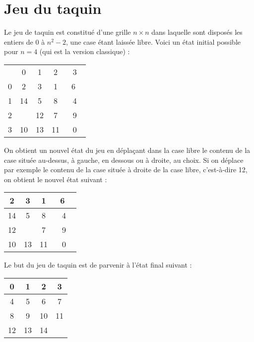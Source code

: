 \section*{Jeu du taquin}

Le jeu de taquin est constitué d'une grille $n \times n$ dans laquelle
sont disposés les entiers de $0$ à $n^{2} - 2$, une case étant laissée libre.
Voici un état initial possible pour $n = 4$ (qui est la version classique) :

\renewcommand{\arraystretch}{1.5}

\begin{center}
  \begin{tabular}{r|c|c|c|c|}
    \multicolumn{1}{c}{}
    & \multicolumn{1}{c}{0}
    & \multicolumn{1}{c}{1}
    & \multicolumn{1}{c}{2}
    & \multicolumn{1}{c}{3} \\ \cline{2-5}
    0 & 2 & 3 & 1 & \ 6 \ \\ \cline{2-5}
    1 & 14 & 5 & 8 & 4 \\ \cline{2-5}
    2 & & 12 & 7 & 9 \\ \cline{2-5}
    3 & 10&13 & 11 & 0 \\ \cline{2-5}
  \end{tabular}
\end{center}

On obtient un nouvel état du jeu en déplaçant dans la case libre le
contenu de la case située au-dessus, à gauche, en dessous ou à droite, au
choix. Si on déplace par exemple le contenu de la case située à droite de
la case libre, c'est-à-dire 12, on obtient le nouvel état suivant :

\begin{center}
  \begin{tabular}{|c|c|c|c|}
    \hline
    2&3&1&\ 6 \ \\
    \hline
    14&5&8&4\\
    \hline
    12&&7&9\\
    \hline
    10&13&11&0\\
    \hline
  \end{tabular}
\end{center}

Le but du jeu de taquin est de parvenir à l'état final suivant :
\begin{center}
  \begin{tabular}{|c|c|c|c|}
    \hline
    0&1&2&3\\\hline
    4&5&6&7\\\hline
    8&9&10&11\\\hline
    12&13&14&\\\hline
  \end{tabular}
\end{center}

